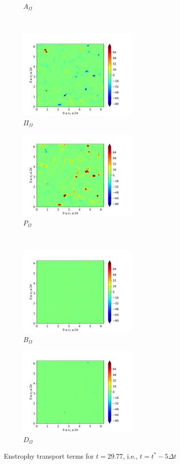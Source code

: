 \begin{figure}[H]
\begin{subfigure}{0.45\textwidth}
        \caption{$A_{\Omega}$}
    \end{subfigure}
    ~
    \begin{subfigure}{0.45\textwidth}
        \includegraphics[height=1.75in]{media/run-cds-65/Pi-enst-1335}
        \caption{$\Pi_{\Omega}$}
    \end{subfigure}
    \newline
    \begin{subfigure}{0.45\textwidth}
        \includegraphics[height=1.75in]{media/run-cds-65/P-enst-1335}
        \caption{$P_{\Omega}$}
    \end{subfigure}
    ~
    \begin{subfigure}{0.45\textwidth}
        \includegraphics[height=1.75in]{media/run-cds-65/B-enst-1335}
        \caption{$B_{\Omega}$}
    \end{subfigure}
    \newline
    \begin{subfigure}{0.45\textwidth}
        \includegraphics[height=1.75in]{media/run-cds-65/D-enst-1335}
        \caption{$D_{\Omega}$}
    \end{subfigure}
    \caption{Enstrophy transport terms for $t=29.77$, i.e., $t=t^{\ast} - 5 \Delta t$}
\end{figure}

